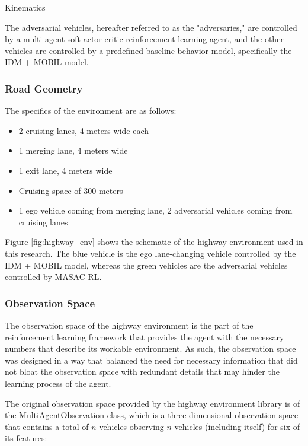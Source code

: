 \documentclass[12pt, a4paper]{report}
\begin{document}
Kinematics

The adversarial vehicles, hereafter referred to as the "adversaries," are controlled by a multi-agent soft 
actor-critic reinforcement learning agent, and the other vehicles are controlled by a predefined baseline 
behavior model, specifically the IDM + MOBIL model.

\subsubsection{Road Geometry}


The specifics of the environment are as follows:

\begin{itemize}
    \item 2 cruising lanes, 4 meters wide each
    \item 1 merging lane, 4 meters wide
    \item 1 exit lane, 4 meters wide
    \item Cruising space of 300 meters
    \item 1 ego vehicle coming from merging lane, 2 adversarial vehicles coming from cruising lanes
\end{itemize}

Figure \ref{fig:highway_env} shows the schematic of the highway environment used in this research. The blue vehicle is the ego lane-changing vehicle
controlled by the IDM + MOBIL model, whereas the green vehicles are the adversarial vehicles controlled by MASAC-RL.

\subsubsection{Observation Space}

The observation space of the highway environment is the part of the reinforcement learning framework that
provides the agent with the necessary numbers that describe its workable environment.
As such, the observation space was designed in a way that balanced the need for necessary information 
that did not bloat the observation space with redundant details that
may hinder the learning process of the agent.

The original observation space provided by the highway environment library is of the MultiAgentObservation class, which is a three-dimensional observation space 
that contains a total of $n$ vehicles observing $n$ vehicles (including itself) for six of its features:
\end{document}
